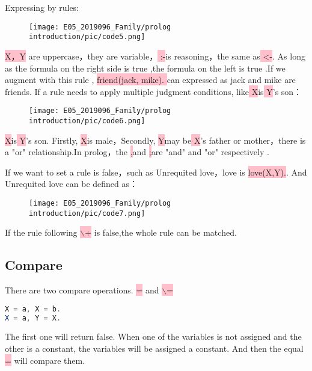 \documentclass[a4paper, 11pt]{article}
\begin{document}
Expressing by rules:

\begin{figure}[ht]
\centering
\texttt{[image: E05\_2019096\_Family/prolog introduction/pic/code5.png]}
\label{fig:label}
\end{figure}


\colorbox{pink}{\color{black} X，Y} are uppercase，they are variable，\colorbox{pink}{\color{black} :-}is reasoning，the same as\colorbox{pink}{\color{black} <-}. As long as the formula on the right side is true ,the formula on the left is true .If we augment with this rule , \colorbox{pink}{\color{black} friend(jack, mike). }can expressed as jack and mike are friends.
If a rule needs to apply multiple judgment conditions, like\colorbox{pink}{\color{black} X}is\colorbox{pink}{\color{black} Y}'s son：


\begin{figure}[H]
\centering
\texttt{[image: E05\_2019096\_Family/prolog introduction/pic/code6.png]}
\label{fig:label}
\end{figure}


\colorbox{pink}{\color{black} X}is\colorbox{pink}{\color{black} Y}'s son. Firstly, \colorbox{pink}{\color{black} X}is male，Secondly, \colorbox{pink}{\color{black} Y}may be\colorbox{pink}{\color{black} X}'s father or mother，there is a "or" relationship.In prolog，the \colorbox{pink}{\color{black} ,}and \colorbox{pink}{\color{black} ;}are "and" and "or" respectively .

If we want to set a rule is false，such as Unrequited love，love is \colorbox{pink}{\color{black} love(X,Y).}. And Unrequited love can be defined as：
\begin{figure}[H]
\centering
\texttt{[image: E05\_2019096\_Family/prolog introduction/pic/code7.png]}
\label{fig:label}
\end{figure}
If the rule following \colorbox{pink}{\color{black}$\backslash$+} is false,the whole rule can be matched.

\subsection{Compare}
There are two compare operations. \colorbox{pink}{\color{black} =} and \colorbox{pink}{\color{black} $\backslash$=}
\begin{lstlisting}[language={java}]
X = a, X = b.
X = a, Y = X.
\end{lstlisting}

The first one will return false. When one of the variables is not assigned and the other is a constant, the variables will be assigned a constant. And then the equal \colorbox{pink}{\color{black} =} will compare them.
\end{document}
